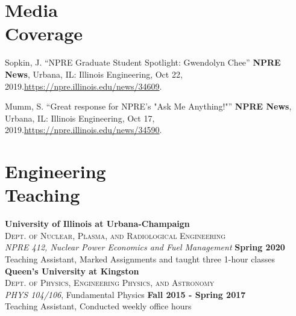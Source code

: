 \documentclass[margin,line]{resume}
\begin{document}
\begin{resume}
    \section{\mysidestyle Media\\Coverage}
    \begin{bibenum}
        \item Sopkin, J. ``NPRE Graduate Student Spotlight: Gwendolyn Chee'' \textbf{NPRE News}, Urbana, IL: Illinois Engineering, Oct 22, 2019.\url{https://npre.illinois.edu/news/34609}.
        \item Mumm, S. ``Great response for NPRE's "Ask Me Anything!"'' \textbf{NPRE News}, Urbana, IL: Illinois Engineering, Oct 17, 2019.\url{https://npre.illinois.edu/news/34590}.
	\end{bibenum}
 
    \section{\mysidestyle Engineering\\Teaching}
    \textbf{University of Illinois at Urbana-Champaign}\\
    \textsc{Dept. of Nuclear, Plasma, and Radiological Engineering}\\ 
               \textsl{NPRE 412, Nuclear Power Economics and Fuel Management} \hfill \textbf{Spring 2020}\\
               Teaching Assistant, Marked Assignments and taught three 1-hour classes
               \vspace{2mm}\\
        \textbf{Queen's University at Kingston}\\
        \textsc{Dept. of Physics, Engineering Physics, and Astronomy}\\ 
                        \textsl{PHYS 104/106}, Fundamental Physics \hfill \textbf{Fall 2015 - Spring 2017}\\
                        Teaching Assistant, Conducted weekly office hours


\end{resume}
\end{document}
